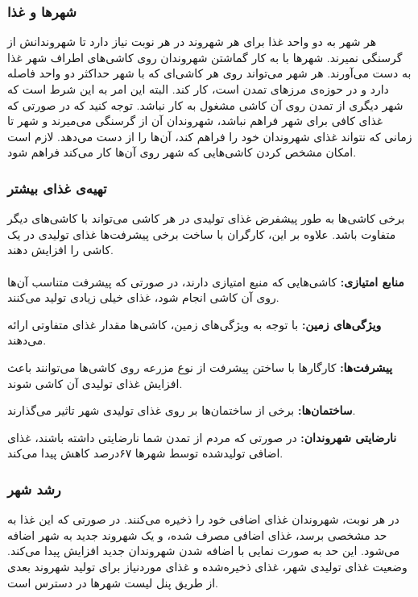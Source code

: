 \documentclass[]{article}
\begin{document}
\subsubsection*{{\titr شهرها و غذا
}}
هر شهر به دو واحد غذا برای هر شهروند در هر نوبت نیاز دارد تا شهروندانش از گرسنگی نمیرند. شهرها با به کار گماشتن شهروندان روی کاشی‌های اطراف شهر غذا به دست می‌آورند. هر شهر می‌تواند روی هر کاشی‌ای که با شهر حداکثر دو واحد فاصله دارد و در حوزه‌ی مرزهای تمدن است، کار کند. البته این امر به این شرط است که شهر دیگری از تمدن روی آن کاشی مشغول به کار نباشد.
توجه کنید که در صورتی که غذای کافی برای شهر فراهم نباشد، شهروندان آن از گرسنگی می‌میرند و شهر تا زمانی که نتواند غذای شهروندان خود را فراهم کند، آن‌ها را از دست می‌دهد.
لازم است امکان مشخص کردن کاشی‌هایی که شهر روی آن‌ها کار می‌کند فراهم شود.

\subsubsection*{{\titr تهیه‌ی غذای بیشتر}}
برخی کاشی‌ها به طور پیشفرض غذای تولیدی در هر کاشی می‌تواند با کاشی‌های دیگر متفاوت باشد. علاوه بر این، کارگران با ساخت برخی پیشرفت‌ها غذای تولیدی در یک کاشی را افزایش دهند.\\
\\
\noindent \textbf{منابع امتیازی:}
کاشی‌هایی که منبع امتیازی دارند، در صورتی که پیشرفت متناسب آن‌ها روی آن کاشی انجام شود، غذای خیلی زیادی تولید می‌کنند.

\noindent \textbf{ویژگی‌های زمین:}
با توجه به ویژگی‌های زمین، کاشی‌ها مقدار غذای متفاوتی ارائه می‌دهند.

\noindent \textbf{پیشرفت‌ها:}
کارگارها با ساختن پیشرفت از نوع مزرعه روی کاشی‌ها می‌توانند باعث افزایش غذای تولیدی آن کاشی شوند.

\noindent \textbf{ساختمان‌ها:}
برخی از ساختمان‌ها بر روی غذای تولیدی شهر تاثیر می‌گذارند.

\noindent \textbf{نارضایتی شهروندان:}
در صورتی که مردم از تمدن شما نارضایتی داشته باشند، غذای اضافی تولید‌شده توسط شهرها ۶۷درصد کاهش پیدا می‌کند.

\subsubsection*{{\titr رشد شهر}}
در هر نوبت، شهروندان غذای اضافی خود را ذخیره می‌کنند. در صورتی که این غذا به حد مشخصی برسد، غذای اضافی مصرف شده، و یک شهروند جدید به شهر اضافه می‌شود. این حد به صورت نمایی با اضافه شدن شهروندان جدید افزایش پیدا می‌کند. وضعیت غذای تولیدی شهر، غذای ذخیره‌شده و غذای موردنیاز برای تولید شهروند بعدی از طریق پنل لیست شهرها در دسترس است.
\end{document}
